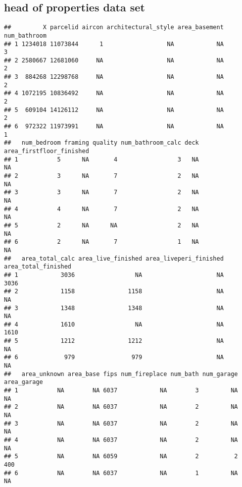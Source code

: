 \documentclass[
]{article}
\begin{document}
\hypertarget{head-of-properties-data-set}{%
\subsection{head of properties data
set}\label{head-of-properties-data-set}}

\begin{verbatim}
##         X parcelid aircon architectural_style area_basement num_bathroom
## 1 1234018 11073844      1                  NA            NA            3
## 2 2580667 12681060     NA                  NA            NA            2
## 3  884268 12298768     NA                  NA            NA            2
## 4 1072195 10836492     NA                  NA            NA            2
## 5  609104 14126112     NA                  NA            NA            2
## 6  972322 11973991     NA                  NA            NA            1
##   num_bedroom framing quality num_bathroom_calc deck area_firstfloor_finished
## 1           5      NA       4                 3   NA                       NA
## 2           3      NA       7                 2   NA                       NA
## 3           3      NA       7                 2   NA                       NA
## 4           4      NA       7                 2   NA                       NA
## 5           2      NA      NA                 2   NA                       NA
## 6           2      NA       7                 1   NA                       NA
##   area_total_calc area_live_finished area_liveperi_finished area_total_finished
## 1            3036                 NA                     NA                3036
## 2            1158               1158                     NA                  NA
## 3            1348               1348                     NA                  NA
## 4            1610                 NA                     NA                1610
## 5            1212               1212                     NA                  NA
## 6             979                979                     NA                  NA
##   area_unknown area_base fips num_fireplace num_bath num_garage area_garage
## 1           NA        NA 6037            NA        3         NA          NA
## 2           NA        NA 6037            NA        2         NA          NA
## 3           NA        NA 6037            NA        2         NA          NA
## 4           NA        NA 6037            NA        2         NA          NA
## 5           NA        NA 6059            NA        2          2         400
## 6           NA        NA 6037            NA        1         NA          NA

\end{verbatim}
\end{document}
